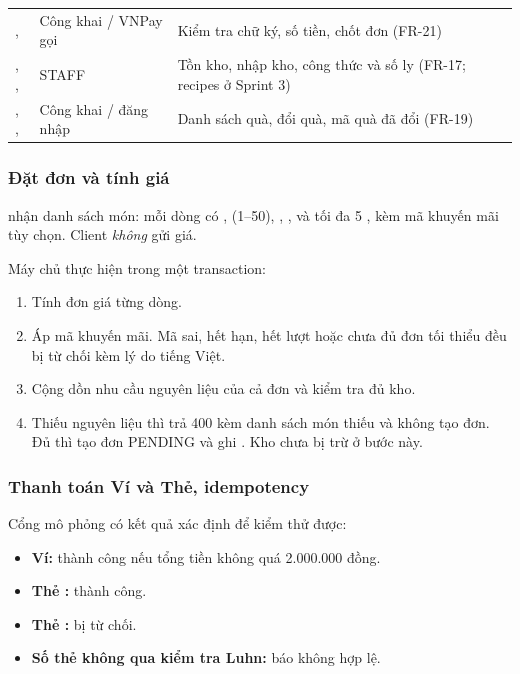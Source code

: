 \begin{longtable}{@{}L{5.2cm}L{2.2cm}L{6.4cm}@{}}
,  & Công khai / VNPay gọi & Kiểm tra chữ ký, số tiền, chốt đơn (FR-21) \\
, ,  & STAFF & Tồn kho, nhập kho, công thức và số ly (FR-17; recipes ở Sprint 3) \\
, ,  & Công khai / đăng nhập & Danh sách quà, đổi quà, mã quà đã đổi (FR-19) \\
\end{longtable}

\subsubsection{Đặt đơn và tính giá}
 nhận danh sách món: mỗi dòng có ,  (1--50), , ,  và tối đa 5 , kèm mã khuyến mãi tùy chọn. Client \emph{không} gửi giá.

Máy chủ thực hiện trong một transaction:
\begin{enumerate}
\item Tính đơn giá từng dòng.
\item Áp mã khuyến mãi. Mã sai, hết hạn, hết lượt hoặc chưa đủ đơn tối thiểu đều bị từ chối kèm lý do tiếng Việt.
\item Cộng dồn nhu cầu nguyên liệu của cả đơn và kiểm tra đủ kho.
\item Thiếu nguyên liệu thì trả 400 kèm danh sách món thiếu và không tạo đơn. Đủ thì tạo đơn PENDING và ghi . Kho chưa bị trừ ở bước này.
\end{enumerate}

\subsubsection{Thanh toán Ví và Thẻ, idempotency}
Cổng mô phỏng có kết quả xác định để kiểm thử được:
\begin{itemize}
\item \textbf{Ví:} thành công nếu tổng tiền không quá 2.000.000 đồng.
\item \textbf{Thẻ :} thành công.
\item \textbf{Thẻ :} bị từ chối.
\item \textbf{Số thẻ không qua kiểm tra Luhn:} báo không hợp lệ.
\end{itemize}

